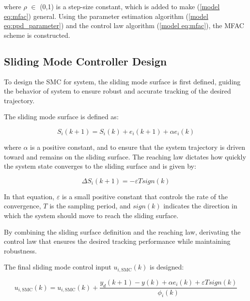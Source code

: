 \documentclass[journal,onecolumn]{IEEEtran}
\begin{document}
where \(\rho\) \(\in\) (0,1) is a step-size constant, which is added to make (\ref{model eq:mfac}) general. Using the parameter estimation algorithm (\ref{model eq:ppd_parameter}) and the control law algorithm (\ref{model eq:mfac}), the MFAC scheme is constructed. 


\subsection{Sliding Mode Controller Design}







To design the SMC for system, the sliding mode surface is first defined, guiding the behavior of system to ensure robust and accurate tracking of the desired trajectory.

The sliding mode surface is defined as:

\begin{equation}
    \label{model eq:sms}
    S_i(k+1) = S_i(k)+e_i(k+1)+\alpha e_i(k) 
\end{equation}

where \(\alpha\) is a positive constant, and  to ensure that the system trajectory is driven toward and remains on the sliding surface. The reaching law dictates how quickly the system state converges to the sliding surface and is given by:

\begin{equation}
    \label{model eq:reaching_law}
    \Delta S_i(k+1) = - \varepsilon T sign(k) 
\end{equation}

In that equation, \(\varepsilon\) is a small positive constant that controls the rate of the convergence, \(T\) is the sampling period, and \(sign(k)\) indicates the direction in which the system should move to reach the sliding surface.

By combining the sliding surface definition and the reaching law, derivating the control law that ensures the desired tracking performance while maintaining robustness.

The final sliding mode control input \(u_{i,\text{SMC}}(k)\) is designed:

\begin{equation}
    \label{model eq:smc}
    u_{i,\text{SMC}}(k) = u_{i,\text{SMC}}(k) + \frac{y_d(k+1)-y(k) + \alpha e_i(k) + \varepsilon T sign(k)}{\phi_i(k)}
\end{equation}
\end{document}
